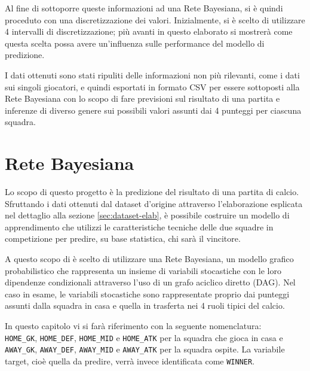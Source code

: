 \documentclass[hidelinks, 12pt]{article}
\begin{document}
Al fine di sottoporre queste informazioni ad una Rete Bayesiana, si è quindi proceduto con una discretizzazione dei valori. Inizialmente, si è scelto di utilizzare 4 intervalli di discretizzazione; più avanti in questo elaborato si mostrerà come questa scelta possa avere un'influenza sulle performance del modello di predizione.

\vspace{5ex}

I dati ottenuti sono stati ripuliti delle informazioni non più rilevanti, come i dati sui singoli giocatori, e quindi esportati in formato CSV per essere sottoposti alla Rete Bayesiana con lo scopo di fare previsioni sul risultato di una partita e inferenze di diverso genere sui possibili valori assunti dai 4 punteggi per ciascuna squadra.



\clearpage



\section{Rete Bayesiana}

Lo scopo di questo progetto è la predizione del risultato di una partita di calcio. Sfruttando i dati ottenuti dal dataset d'origine attraverso l'elaborazione esplicata nel dettaglio alla sezione \ref{sec:dataset-elab}, è possibile costruire un modello di apprendimento che utilizzi le caratteristiche tecniche delle due squadre in competizione per predire, su base statistica, chi sarà il vincitore.

A questo scopo di è scelto di utilizzare una Rete Bayesiana, un modello grafico probabilistico che rappresenta un insieme di variabili stocastiche con le loro dipendenze condizionali attraverso l'uso di un grafo aciclico diretto (DAG). Nel caso in esame, le variabili stocastiche sono rappresentate proprio dai punteggi assunti dalla squadra in casa e quella in trasferta nei 4 ruoli tipici del calcio. 

In questo capitolo vi si farà riferimento con la seguente nomenclatura: \\
\texttt{HOME\_GK}, \texttt{HOME\_DEF}, \texttt{HOME\_MID} e \texttt{HOME\_ATK} per la squadra che gioca in casa e \\
\texttt{AWAY\_GK}, \texttt{AWAY\_DEF}, \texttt{AWAY\_MID} e \texttt{AWAY\_ATK} per la squadra ospite.
La variabile target, cioè quella da predire, verrà invece identificata come \texttt{WINNER}.
\end{document}
